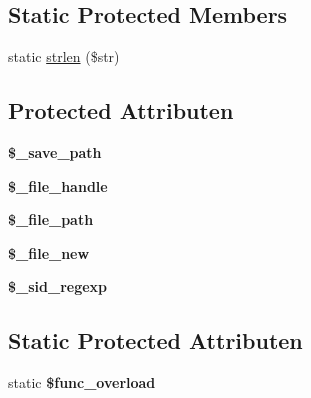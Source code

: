 \subsection*{Static Protected Members}
\begin{DoxyCompactItemize}
\item 
static \mbox{\hyperlink{class_c_i___session__files__driver_a4c29a687d4ed62c26a10e41d98930d5f}{strlen}} (\$str)
\end{DoxyCompactItemize}
\subsection*{Protected Attributen}
\begin{DoxyCompactItemize}
\item 
\mbox{\label{class_c_i___session__files__driver_a6435cefa01b850e041ae9066224e8a4d}} 
{\bfseries \$\+\_\+save\+\_\+path}
\item 
\mbox{\label{class_c_i___session__files__driver_a5d9e30c347d3adb8f7bd47da3566ce69}} 
{\bfseries \$\+\_\+file\+\_\+handle}
\item 
\mbox{\label{class_c_i___session__files__driver_af2a67abb59f4c991dd98452ec6e6dcc7}} 
{\bfseries \$\+\_\+file\+\_\+path}
\item 
\mbox{\label{class_c_i___session__files__driver_a996c4705d21476b028bf762e63257114}} 
{\bfseries \$\+\_\+file\+\_\+new}
\item 
\mbox{\label{class_c_i___session__files__driver_a4e2477585e746eb415b2b69bb237be72}} 
{\bfseries \$\+\_\+sid\+\_\+regexp}
\end{DoxyCompactItemize}
\subsection*{Static Protected Attributen}
\begin{DoxyCompactItemize}
\item 
\mbox{\label{class_c_i___session__files__driver_aef84be58d58a5895572c5689e56a1047}} 
static {\bfseries \$func\+\_\+overload}
\end{DoxyCompactItemize}
